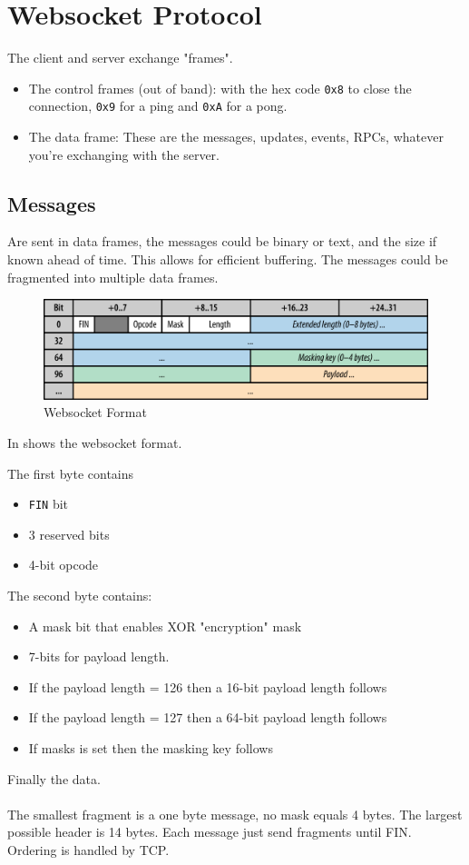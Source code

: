 \documentclass[../CMPUT-404-Notes.tex]{subfiles}
\begin{document}
\section{Websocket Protocol}
The client and server exchange "frames".
\begin{itemize}
    \item The control frames (out of band): with the hex code \texttt{0x8} to close the connection, \texttt{0x9} for a ping and \texttt{0xA} for a pong. 
    \item The data frame: These are the messages, updates, events, RPCs, whatever you're exchanging with the server.    
\end{itemize}

\subsection{Messages}
Are sent in data frames, the messages could be binary or text, and the size if known ahead of time. This allows for efficient buffering.
The messages could be fragmented into multiple data frames.

\begin{figure}[!h]
    \centering
    \includegraphics[width=\columnwidth]{../assets/websocket-frame.png}
    \caption{Websocket Format}
    \label{fig:websocket}
\end{figure}

In  shows the websocket format.

The first byte contains
\begin{itemize}
    \item \texttt{FIN} bit 
    \item 3 reserved bits 
    \item 4-bit opcode  
\end{itemize} 
The second byte contains:
\begin{itemize}
    \item A mask bit that enables XOR "encryption" mask 
    \item 7-bits for payload length.
    \item If the payload length = 126 then a 16-bit payload length follows
    \item If the payload length = 127 then a 64-bit payload length follows
    \item If masks is set then the masking key follows
\end{itemize}
Finally the data.
\\~\\
The smallest fragment is a one byte message, no mask equals 4 bytes. 
The largest possible header is 14 bytes.
Each message just send fragments until FIN.
Ordering is handled by TCP. 
\end{document}
